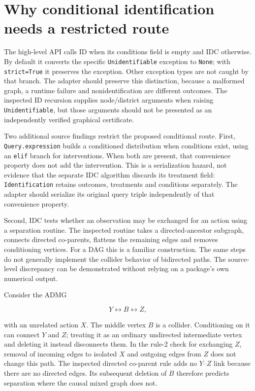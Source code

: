 \hypertarget{why-conditional-identification-needs-a-restricted-route}{%
\section{Why conditional identification needs a restricted
route}\label{why-conditional-identification-needs-a-restricted-route}}

The high-level API calls ID when its conditions field is empty and IDC
otherwise. By default it converts the specific \texttt{Unidentifiable}
exception to \texttt{None}; with \texttt{strict=True} it preserves the
exception. Other exception types are not caught by that branch. The
adapter should preserve this distinction, because a malformed graph, a
runtime failure and nonidentification are different outcomes. The
inspected ID recursion supplies node/district arguments when raising
\texttt{Unidentifiable}, but those arguments should not be presented as
an independently verified graphical certificate.
\citep{exec13_y0_api,exec13_y0_id}

Two additional source findings restrict the proposed conditional route.
First, \texttt{Query.expression} builds a conditioned distribution when
conditions exist, using an \texttt{elif} branch for interventions. When
both are present, that convenience property does not add the
intervention. This is a serialization hazard, not evidence that the
separate IDC algorithm discards its treatment field:
\texttt{Identification} retains outcomes, treatments and conditions
separately. The adapter should serialize its original query triple
independently of that convenience property. \citep{exec13_y0_utils}

Second, IDC tests whether an observation may be exchanged for an action
using a separation routine. The inspected routine takes a
directed-ancestor subgraph, connects directed co-parents, flattens the
remaining edges and removes conditioning vertices. For a DAG this is a
familiar construction. The same steps do not generally implement the
collider behavior of bidirected paths. The source-level discrepancy can
be demonstrated without relying on a package's own numerical output.
\citep{exec13_y0_idc,exec13_y0_rule2,exec13_y0_separation,exec13_y0_graph}

Consider the ADMG

\[
 Y\leftrightarrow B\leftrightarrow Z,
\]

with an unrelated action \(X\). The middle vertex \(B\) is a collider.
Conditioning on it can connect \(Y\) and \(Z\); treating it as an
ordinary undirected intermediate vertex and deleting it instead
disconnects them. In the rule-2 check for exchanging \(Z\), removal of
incoming edges to isolated \(X\) and outgoing edges from \(Z\) does not
change this path. The inspected directed co-parent rule adds no
\(Y\)--\(Z\) link because there are no directed edges. Its subsequent
deletion of \(B\) therefore predicts separation where the causal mixed
graph does not.

